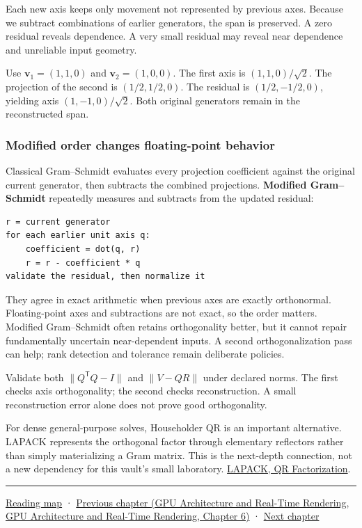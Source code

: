 Each new axis keeps only movement not represented by previous axes. Because we subtract combinations of earlier generators, the span is preserved. A zero residual reveals dependence. A very small residual may reveal near dependence and unreliable input geometry.

Use \(\mathbf v_1=(1,1,0)\) and \(\mathbf v_2=(1,0,0)\). The first axis is \((1,1,0)/\sqrt2\). The projection of the second is \((1/2,1/2,0)\). The residual is \((1/2,-1/2,0)\), yielding axis \((1,-1,0)/\sqrt2\). Both original generators remain in the reconstructed span.

\subsubsection{Modified order changes floating-point behavior}\label{01-foundations-i-ch017-modified-order-changes-floating-point-behavior}

Classical Gram--Schmidt evaluates every projection coefficient against the original current generator, then subtracts the combined projections. \textbf{Modified Gram--Schmidt} repeatedly measures and subtracts from the updated residual:

\begin{verbatim}
r = current generator
for each earlier unit axis q:
    coefficient = dot(q, r)
    r = r - coefficient * q
validate the residual, then normalize it
\end{verbatim}

They agree in exact arithmetic when previous axes are exactly orthonormal. Floating-point axes and subtractions are not exact, so the order matters. Modified Gram--Schmidt often retains orthogonality better, but it cannot repair fundamentally uncertain near-dependent inputs. A second orthogonalization pass can help; rank detection and tolerance remain deliberate policies.

Validate both \(\|Q^\mathsf TQ-I\|\) and \(\|V-QR\|\) under declared norms. The first checks axis orthogonality; the second checks reconstruction. A small reconstruction error alone does not prove good orthogonality.

For dense general-purpose solves, Householder QR is an important alternative. LAPACK represents the orthogonal factor through elementary reflectors rather than simply materializing a Gram matrix. This is the next-depth connection, not a new dependency for this vault's small laboratory. \href{https://www.netlib.org/lapack/lug/node40.html}{LAPACK, QR Factorization}.

\begin{center}\rule{0.5\linewidth}{0.5pt}\end{center}

\hyperref[volume-reading-map]{Reading map} · \href{../06-GPU-Architecture-and-Real-Time-Rendering/main.pdf\#nameddest=01-foundations-i-ch016-profile-gpus-and-respect-apple-ownership-boundaries}{Previous chapter (GPU Architecture and Real-Time Rendering, GPU Architecture and Real-Time Rendering, Chapter 6)} · \hyperref[01-foundations-i-ch018-vectors-for-light-and-frames]{Next chapter}
